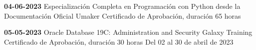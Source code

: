 \begin{devent}
    \cvevent
	{\textbf{04-06-2023}}
	{Especialización Completa en Programación con Python desde la Documentación Oficial}
	{Umaker}
	{Certificado de Aprobación, duración 65 horas}
	{}
\end{devent}

\begin{devent}
    \cvevent
	{\textbf{05-05-2023}}
	{Oracle Database 19C: Administration and Security}
	{Galaxy Training}
	{Certificado de Aprobación, duración 30 horas}
	{Del 02 al 30 de abril de 2023}
\end{devent}







